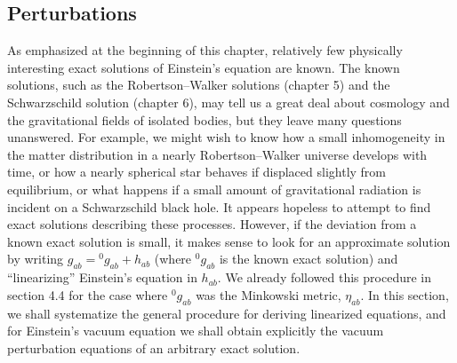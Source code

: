 
\subsection{Perturbations}\label{sec:7.5}

As emphasized at the beginning of this chapter, relatively few physically
interesting exact solutions of Einstein's equation are known. The known solutions,
such as the Robertson--Walker solutions (chapter 5) and the Schwarzschild solution
(chapter 6), may tell us a great deal about cosmology and the gravitational fields of
isolated bodies, but they leave many questions unanswered. For example, we might
wish to know how a small inhomogeneity in the matter distribution in a nearly
Robertson--Walker universe develops with time, or how a nearly spherical star
behaves if displaced slightly from equilibrium, or what happens if a small amount of
gravitational radiation is incident on a Schwarzschild black hole. It appears hopeless
to attempt to find exact solutions describing these processes. However, if the
deviation from a known exact solution is small, it makes sense to look for an
approximate solution by writing \(g_{ab}={}^{0}g_{ab}+h_{ab}\) (where
\({}^{0}g_{ab}\) is the known exact solution) and “linearizing” Einstein's equation
in \(h_{ab}\). We already followed this procedure in section 4.4 for the case where
\({}^{0}g_{ab}\) was the Minkowski metric, \(\eta_{ab}\). In this section, we shall
systematize the general procedure for deriving linearized equations, and for
Einstein's vacuum equation we shall obtain explicitly the vacuum perturbation
equations of an arbitrary exact solution.

